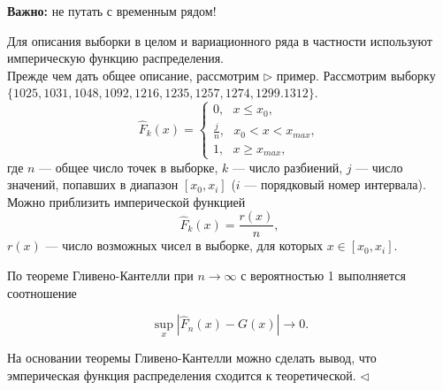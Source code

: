 \documentclass[12pt]{article}
\begin{document}
\begin{framed}
    \textbf{Важно:} не путать с временным рядом!
\end{framed}

Для описания выборки в целом и вариационного ряда в частности используют империческую функцию распределения.\\

Прежде чем дать общее описание, рассмотрим $\triangleright$ пример. Рассмотрим выборку  $\{ 1025, 1031, 1048, 1092, 1216, 1235, 1257, 1274, 1299. 1312 \}$.
\[ \hat{F}_k(x) = 
\begin{cases}
    0, ~~~x \leq x_0,\\
    \frac{j}{n}, ~~~x_0 < x < x_{max},\\
    1, ~~~ x \geq x_{max},
\end{cases}
\]
где $n$ --- общее число точек в выборке, $k$ --- число разбиений, $j$ --- число значений, попавших в диапазон $[x_0, x_i]$ ($i$ --- порядковый номер интервала). Можно приблизить имперической функцией
\[ \hat{F}_k (x) = \frac{r(x)}{n}, \]
$r(x)$ --- число возможных чисел в выборке, для которых $x \in [x_0, x_i]$. 

По теореме Гливено-Кантелли при $n \to \infty$ с вероятностью 1 выполняется соотношение

\[ \sup_x \left| \hat{F}_n(x) - G(x) \right| \to 0. \]

На основании теоремы Гливено-Кантелли можно сделать вывод, что эмперическая функция распределения сходится к теоретической.
$\triangleleft$

  
\end{document}
